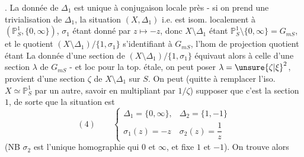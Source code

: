 . La donnée de $\Delta_1$ est unique à conjugaison locale près - si on prend une trivialisation de  $\Delta_1$,  la situation $(X,\Delta_1)$ i.e.  est isom. localement à $(\mathbb P^1_S,\{0,\infty\})$, $\sigma_1$ étant donné par $z\longmapsto-z$, donc $X\setminus\Delta_1$ étant  $\mathbb P^1_S\setminus\{0,\infty\}=G_{mS}$, et le quotient $(X\setminus\Delta_1)/\{1,\sigma_1\}$ s'identifiant à $G_{mS}$, l'hom de projection quotient étant
La donnée d'une section de $(X\setminus\Delta_1)/\{1,\sigma_1\}$ équivaut alors à celle d'une section $\lambda$ de $G_{mS}$ - et loc pour la top. étale, on peut poser $\lambda=\unsure{\zeta|\xi}^2$,    \inserted{$\lambda$} provient d'une section $\zeta$ de $X\setminus\Delta_1$ sur $S$. On peut (quitte à remplacer l'iso. $X\simeq\mathbb P^1_S$ par un autre, savoir en multipliant par $1/\zeta$) supposer que c'est la section $1$, de sorte que la situation  est
\[
(4)\qquad\left\{\begin{array}{ll}
\Delta_1=\{0,\infty\},&\Delta_2=\{1,-1\}\\[1ex]
\sigma_1(z)=-z&\sigma_2(z)=\dfrac1z
\end{array}\right.
\]
(NB $\sigma_2$ est l'unique homographie qui  $0$ et $\infty$, et fixe $1$ et $-1$). On trouve alors
